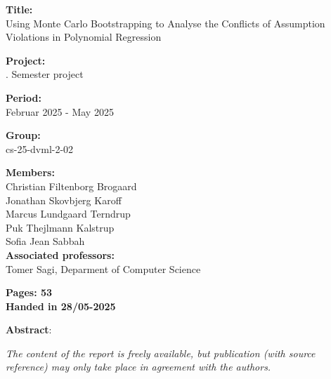\begin{minipage}[t]{0.48\textwidth}
\textbf{Title:} \\[5pt]
\noindent Using Monte Carlo Bootstrapping to Analyse the Conflicts of Assumption Violations in Polynomial Regression

\vspace*{2ex}

\textbf{Project:} \\[5pt]. Semester project

\textbf{Period:} \\[5pt]\bigskip
Februar 2025 -  May 2025

\textbf{Group:} \\[5pt]\bigskip
cs-25-dvml-2-02

\textbf{Members:} \\[5pt]
Christian Filtenborg Brogaard \\
Jonathan Skovbjerg Karoff \\
Marcus Lundgaard Terndrup \\
Puk Thejlmann Kalstrup \\
Sofia Jean Sabbah \\


\textbf{Associated professors:} \\[5pt]
Tomer Sagi, Deparment of Computer Science
\\\hspace*{2ex}

\vspace*{1cm}

\textbf{Pages: 53} \\
\textbf{Handed in 28/05-2025}

\end{minipage}
\hfill
\begin{minipage}[t]{0.5\textwidth}
\textbf{Abstract}: \\[5pt]
\fbox{\parbox{8cm}{}}
\end{minipage}

\vfill

{\footnotesize\itshape \noindent The content of the report is freely available, but publication (with source reference) may only take place in agreement with the authors.}


